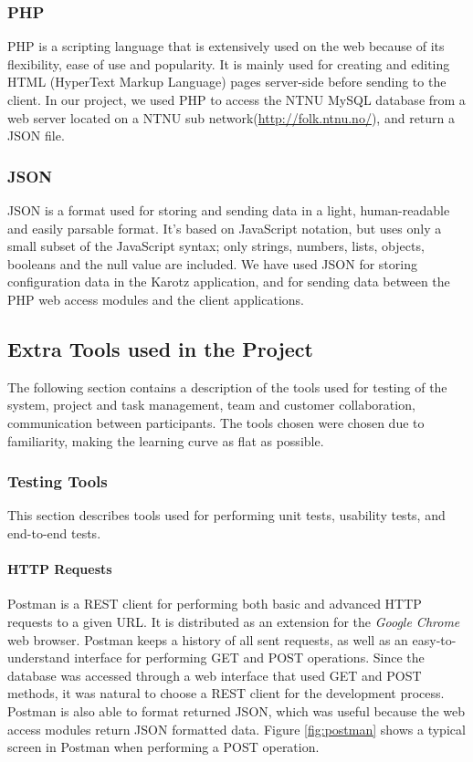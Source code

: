 \subsubsection{PHP}
PHP\cite{php} is a scripting language that is extensively used on the web because of its flexibility, ease of use
and popularity. It is mainly used for creating and editing HTML (HyperText Markup Language) pages server-side before sending to the client. In
our project, we used PHP to access the NTNU MySQL database from a web server located on a NTNU sub network(\url{http://folk.ntnu.no/}), 
and return a JSON file.

\subsubsection{JSON}
JSON\cite{json} is a format used for storing and sending data in a light, human-readable and easily parsable format.
It's based on JavaScript notation, but uses only a small subset of the JavaScript syntax; only strings, numbers, lists,
objects, booleans and the null value are included. We have used JSON for storing configuration data in the Karotz application, 
and for sending data between the PHP web access modules and the client applications.

\subsection{Extra Tools used in the Project}

The following section contains a description of the tools used for testing of the system, project and task 
management, team and customer collaboration, communication between participants. 
The tools chosen were chosen due to familiarity, making the learning curve as flat 
as possible. 

\subsubsection{Testing Tools}
This section describes tools used for performing unit tests, usability tests, and 
end-to-end tests.

\paragraph{HTTP Requests}
Postman\cite{postman} is a REST client for performing both basic and advanced HTTP requests to a
given URL. It is distributed as an extension for the \emph{Google Chrome} web browser. Postman keeps
a history of all sent requests, as well as an easy-to-understand interface for performing GET and
POST operations. Since the database was accessed through a web interface that used GET and POST methods,
it was natural to choose a REST client for the development process. Postman is also able to format
returned JSON, which was useful because the web access modules return JSON formatted data.
Figure \ref{fig:postman} shows a typical screen in Postman when performing a POST operation.

